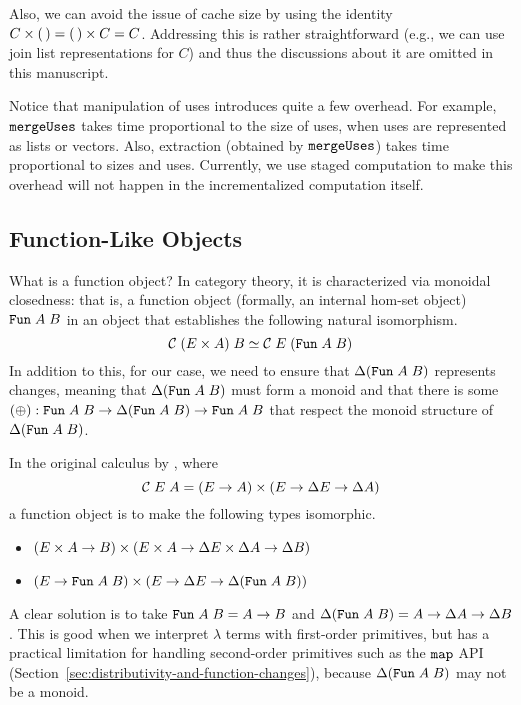 \documentclass{article}
\theoremstyle{definition}
\begin{document}
Also, we can avoid the issue of cache size by using the identity $C \times (\,) = (\,) \times C = C$. Addressing this is rather straightforward (e.g., we can use join list representations for $C$) 
and thus the discussions about it are  omitted in this manuscript. 

Notice that manipulation of uses introduces quite a few overhead. For example, $\texttt{mergeUses}$ takes time proportional to the size of uses, when uses are represented as lists or vectors. 
Also, extraction (obtained by $\texttt{mergeUses}$) takes time proportional to sizes and uses. 
Currently, we use staged computation to make this overhead will not happen in the incrementalized computation itself. 

\subsection{Function-Like Objects}


What is a function object? In category theory, it is characterized via monoidal closedness: that is, a function object (formally, an internal hom-set object) $\texttt{Fun} \; A \; B$ 
in an object that establishes the following natural isomorphism. 
\[
\mathcal{C} \; (E \times A) \; B \simeq \mathcal{C} \; E \; (\texttt{Fun} \; A \; B)
\]
In addition to this, for our case, we need to ensure that $\Delta (\texttt{Fun} \; A \; B)$ represents 
changes, meaning that $\Delta (\texttt{Fun} \; A \; B)$ must form a monoid and that there is some $(\oplus) : \texttt{Fun} \; A \; B \to \Delta (\texttt{Fun} \; A \; B) \to \texttt{Fun} \; A \; B$ that respect the monoid structure of $\Delta (\texttt{Fun} \; A \; B)$. 

In the original calculus by \citet{CaiGRO14}, where 
\[
\mathcal{C} \; E \; A = (E \to A) \times (E \to \Delta E \to \Delta A)
\]
a function object is to make the following types isomorphic. 
\begin{itemize}
 \item 
   \( (E \times A \to B ) \times ( E \times A \to \Delta E \times \Delta A \to \Delta B) \)
 \item 
   \( 
   (E \to \texttt{Fun} \; A \; B) \times (E \to \Delta E \to \Delta (\texttt{Fun} \; A \; B))
   \) 
\end{itemize}
A clear solution is to take $\texttt{Fun} \; A \; B = A \to B$ and $\Delta (\texttt{Fun} \; A \; B) = A \to \Delta A \to \Delta B$. 
This is good when we interpret $\lambda$ terms with first-order primitives, but has a practical limitation for handling 
second-order primitives such as the $\texttt{map}$ API (Section~\ref{sec:distributivity-and-function-changes}), because $\Delta(\texttt{Fun} \; A \; B)$ may not be a monoid.
\end{document}
